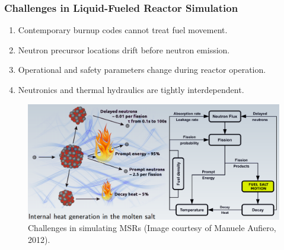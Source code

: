 \begin{frame}
  \frametitle{Challenges in Liquid-Fueled Reactor Simulation}
                  \vspace*{-0.05in}
               \begin{enumerate}
                \item Contemporary burnup codes cannot treat fuel movement.
                \item Neutron precursor locations drift before neutron emission.
                \item Operational and safety parameters change during reactor operation.
                \item Neutronics and thermal hydraulics are tightly interdependent.
               \end{enumerate}

           \begin{figure}[t]
                \vspace*{-0.05in}
			\hspace*{-0.2in}
                \includegraphics[height=0.47\textwidth]{./images/coupled_physics.png}
		\vspace*{-0.05in}
		\caption{Challenges in simulating \glspl{MSR} (Image courtesy of Manuele Aufiero, 2012).}
     	 \end{figure}               
\end{frame}

